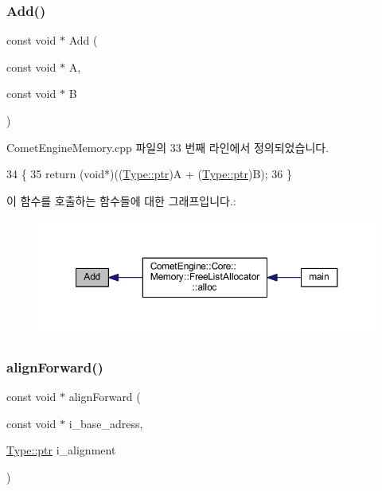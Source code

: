 \subsubsection{\texorpdfstring{Add()}{Add()}}
{\footnotesize\ttfamily const void $\ast$ Add (\begin{DoxyParamCaption}\item[{const void $\ast$}]{A,  }\item[{const void $\ast$}]{B }\end{DoxyParamCaption})}



Comet\+Engine\+Memory.\+cpp 파일의 33 번째 라인에서 정의되었습니다.


\begin{DoxyCode}
34 \{
35     \textcolor{keywordflow}{return} (\textcolor{keywordtype}{void}*)((\hyperlink{namespace_comet_engine_1_1_type_aeb22ad46de677e9a50679dfebeb0e6f0}{Type::ptr})A + (\hyperlink{namespace_comet_engine_1_1_type_aeb22ad46de677e9a50679dfebeb0e6f0}{Type::ptr})B);
36 \}
\end{DoxyCode}
이 함수를 호출하는 함수들에 대한 그래프입니다.\+:
\nopagebreak
\begin{figure}[H]
\begin{center}
\leavevmode
\includegraphics[width=350pt]{namespace_comet_engine_1_1_core_1_1_memory_1_1_utils_a93ae170a43dac9da0116187242b35a6f_icgraph}
\end{center}
\end{figure}
\mbox{\label{namespace_comet_engine_1_1_core_1_1_memory_1_1_utils_a893da9f083981a41e4ada733c3d0661f}} 
\subsubsection{\texorpdfstring{align\+Forward()}{alignForward()}}
{\footnotesize\ttfamily const void $\ast$ align\+Forward (\begin{DoxyParamCaption}\item[{const void $\ast$}]{i\+\_\+base\+\_\+adress,  }\item[{\hyperlink{namespace_comet_engine_1_1_type_aeb22ad46de677e9a50679dfebeb0e6f0}{Type\+::ptr}}]{i\+\_\+alignment }\end{DoxyParamCaption})}



